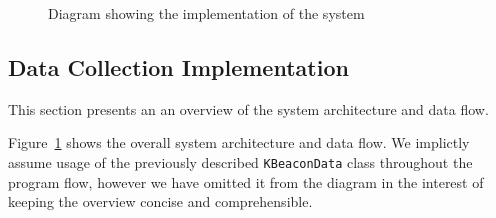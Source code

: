 




\begin{figure}[H]
  \centering
  \caption{Diagram showing the implementation of the system}
  \label{fig:implementation_diagram}
\end{figure}

\subsection{Data Collection Implementation}\label{sec:data_collection_implementation}
This section presents an an overview of the system architecture and data flow.

Figure~\ref{fig:implementation_diagram} shows the overall system architecture and data flow.
We implictly assume usage of the previously described \texttt{KBeaconData} class throughout the program flow, however we have omitted it from the diagram in the interest of keeping the overview concise and comprehensible.

